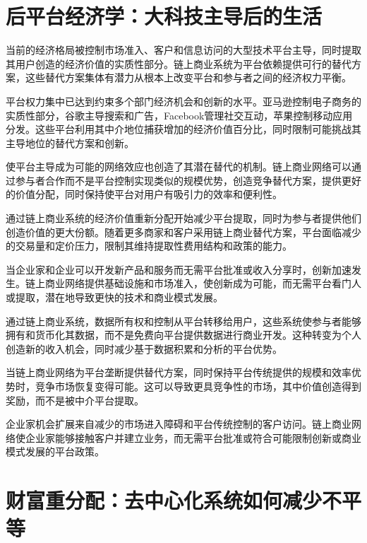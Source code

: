 \documentclass[
  Letterpaper,
]{scrbook}
\begin{document}
\section{后平台经济学：大科技主导后的生活}\label{ux540eux5e73ux53f0ux7ecfux6d4eux5b66ux5927ux79d1ux6280ux4e3bux5bfcux540eux7684ux751fux6d3b}

当前的经济格局被控制市场准入、客户和信息访问的大型技术平台主导，同时提取其用户创造的经济价值的实质性部分。链上商业系统为平台依赖提供可行的替代方案，这些替代方案集体有潜力从根本上改变平台和参与者之间的经济权力平衡。

平台权力集中已达到约束多个部门经济机会和创新的水平。亚马逊控制电子商务的实质性部分，谷歌主导搜索和广告，Facebook管理社交互动，苹果控制移动应用分发。这些平台利用其中介地位捕获增加的经济价值百分比，同时限制可能挑战其主导地位的替代方案和创新。

使平台主导成为可能的网络效应也创造了其潜在替代的机制。链上商业网络可以通过参与者合作而不是平台控制实现类似的规模优势，创造竞争替代方案，提供更好的价值分配，同时保持使平台对用户有吸引力的效率和便利性。

通过链上商业系统的经济价值重新分配开始减少平台提取，同时为参与者提供他们创造价值的更大份额。随着更多商家和客户采用链上商业替代方案，平台面临减少的交易量和定价压力，限制其维持提取性费用结构和政策的能力。

当企业家和企业可以开发新产品和服务而无需平台批准或收入分享时，创新加速发生。链上商业网络提供基础设施和市场准入，使创新成为可能，而无需平台看门人或提取，潜在地导致更快的技术和商业模式发展。

通过链上商业系统，数据所有权和控制从平台转移给用户，这些系统使参与者能够拥有和货币化其数据，而不是免费向平台提供数据进行商业开发。这种转变为个人创造新的收入机会，同时减少基于数据积累和分析的平台优势。

当链上商业网络为平台垄断提供替代方案，同时保持平台传统提供的规模和效率优势时，竞争市场恢复变得可能。这可以导致更具竞争性的市场，其中价值创造得到奖励，而不是被中介平台提取。

企业家机会扩展来自减少的市场进入障碍和平台传统控制的客户访问。链上商业网络使企业家能够接触客户并建立业务，而无需平台批准或符合可能限制创新或商业模式发展的平台政策。

\section{财富重分配：去中心化系统如何减少不平等}\label{ux8d22ux5bccux91cdux5206ux914dux53bbux4e2dux5fc3ux5316ux7cfbux7edfux5982ux4f55ux51cfux5c11ux4e0dux5e73ux7b49}
\end{document}

